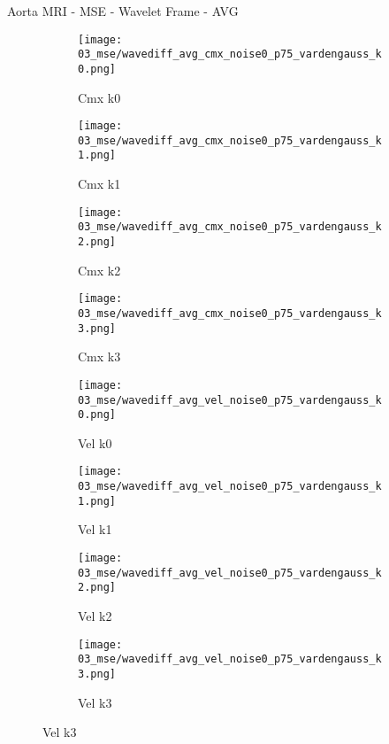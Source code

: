 \documentclass{beamer}
\begin{document}
\begin{frame}{Aorta MRI - MSE - Wavelet Frame - AVG}{}
\begin{figure}
\begin{subfigure}{0.24\textwidth}
\texttt{[image: 03\_mse/wavediff\_avg\_cmx\_noise0\_p75\_vardengauss\_k0.png]}
\vspace{-20pt}
\caption*{\tiny Cmx k0}
\end{subfigure}
\begin{subfigure}{0.24\textwidth}
\texttt{[image: 03\_mse/wavediff\_avg\_cmx\_noise0\_p75\_vardengauss\_k1.png]}
\vspace{-20pt}
\caption*{\tiny Cmx k1}
\end{subfigure}
\begin{subfigure}{0.24\textwidth}
\texttt{[image: 03\_mse/wavediff\_avg\_cmx\_noise0\_p75\_vardengauss\_k2.png]}
\vspace{-20pt}
\caption*{\tiny Cmx k2}
\end{subfigure}
\begin{subfigure}{0.24\textwidth}
\texttt{[image: 03\_mse/wavediff\_avg\_cmx\_noise0\_p75\_vardengauss\_k3.png]}
\vspace{-20pt}
\caption*{\tiny Cmx k3}
\end{subfigure}

\begin{subfigure}{0.24\textwidth}
\texttt{[image: 03\_mse/wavediff\_avg\_vel\_noise0\_p75\_vardengauss\_k0.png]}
\vspace{-20pt}
\caption*{\tiny Vel k0}
\end{subfigure}
\begin{subfigure}{0.24\textwidth}
\texttt{[image: 03\_mse/wavediff\_avg\_vel\_noise0\_p75\_vardengauss\_k1.png]}
\vspace{-20pt}
\caption*{\tiny Vel k1}
\end{subfigure}
\begin{subfigure}{0.24\textwidth}
\texttt{[image: 03\_mse/wavediff\_avg\_vel\_noise0\_p75\_vardengauss\_k2.png]}
\vspace{-20pt}
\caption*{\tiny Vel k2}
\end{subfigure}
\begin{subfigure}{0.24\textwidth}
\texttt{[image: 03\_mse/wavediff\_avg\_vel\_noise0\_p75\_vardengauss\_k3.png]}
\vspace{-20pt}
\caption*{\tiny Vel k3}
\end{subfigure}
\end{figure}
\end{frame}
\end{document}
